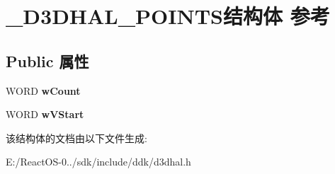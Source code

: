 \hypertarget{struct___d3_d_h_a_l___p_o_i_n_t_s}{}\section{\+\_\+\+D3\+D\+H\+A\+L\+\_\+\+P\+O\+I\+N\+T\+S结构体 参考}
\label{struct___d3_d_h_a_l___p_o_i_n_t_s}
\subsection*{Public 属性}
\begin{DoxyCompactItemize}
\item 
\mbox{\label{struct___d3_d_h_a_l___p_o_i_n_t_s_afcf406f318cc81f61945314d8515d6c5}} 
W\+O\+RD {\bfseries w\+Count}
\item 
\mbox{\label{struct___d3_d_h_a_l___p_o_i_n_t_s_a52801c1974e2e026dd123bea56841ea5}} 
W\+O\+RD {\bfseries w\+V\+Start}
\end{DoxyCompactItemize}


该结构体的文档由以下文件生成\+:\begin{DoxyCompactItemize}
\item 
E\+:/\+React\+O\+S-\/0../sdk/include/ddk/d3dhal.\+h\end{DoxyCompactItemize}
